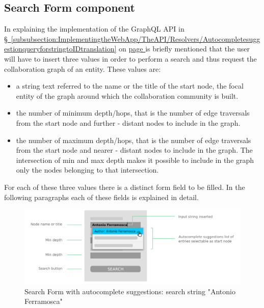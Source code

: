 \subsection{Search Form component} \label{subsection:ImplementingtheWebApp/Thefrontend/SearchFormcomponent}
In explaining the implementation of the \gls{GraphQL} API in \hyperref[subsubsection:ImplementingtheWebApp/TheAPI/Resolvers/AutocompletesuggestionqueryforstringtoIDtranslation]{\S\ \ref{subsubsection:ImplementingtheWebApp/TheAPI/Resolvers/AutocompletesuggestionqueryforstringtoIDtranslation}} on \hyperref[tobementionedthefrontendthreeinputs]{page \pageref*{tobementionedthefrontendthreeinputs}} is briefly mentioned that the user will have to insert three values in order to perform a search and thus request the collaboration graph of an entity.
These values are:
 \begin{itemize}[noitemsep]
	\item a string text referred to the name or the title of the start node, the focal entity of the graph around which the collaboration community is built.
	\item the number of minimum depth/hops, that is the number of edge traversals from the start node and further - distant nodes to include in the graph.
	\item the number of maximum depth/hops, that is the number of edge traversals from the start node and nearer - distant nodes to include in the graph. The intersection of min and max depth makes it possible to include in the graph only the nodes belonging to that intersection.
\end{itemize}

For each of these three values there is a distinct form field to be filled.
In the following paragraphs each of these fields is explained in detail.

\begin{figure}[H]%
	\centering%
	\includegraphics[width=1\textwidth]{images/chapter4/frontendsearchformautocomplete.pdf}%
	\caption[Search Form with autocomplete suggestions: search string "Antonio Ferramosca"]{Search Form with autocomplete suggestions: search string "Antonio Ferramosca"}%
	\label{fig:frontendsearchformautocomplete}
\end{figure}%


